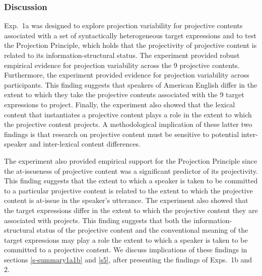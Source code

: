\documentclass[11pt,fleqn]{article}
\newcommand{\6}{\mbox{$[\hspace*{-.6mm}[$}}
\newcommand{\9}{\mbox{$]\hspace*{-.6mm}]$}}
\newcommand{\jd}[1]{\textbf{\color{Green}[jd: #1]}}
\begin{document}
%
%
%
%
%
%


\subsubsection{Discussion}\label{s-discussion1a}

Exp.~1a was designed to explore projection variability for projective contents associated with a set of syntactically heterogeneous target expressions and to test the Projection Principle, which holds that the projectivity of projective content is related to its information-structural status. The experiment provided robust empirical evidence for projection variability across the 9 projective contents. Furthermore, the experiment provided evidence for projection variability across participants. This finding suggests that speakers of American English differ in the extent to which they take the projective contents associated with the 9 target expressions to project. Finally, the experiment also showed that the lexical content that instantiates a projective content plays a role in the extent to which the projective content projects. A methodological implication of these latter two findings is that research on projective content must be sensitive to potential inter-speaker and inter-lexical content differences.

The experiment also provided empirical support for the Projection Principle since the at-issueness of projective content was a significant predictor of its projectivity. This finding suggests that the extent to which a speaker is taken to be committed to a particular projective content is related to the extent to which the projective content is at-issue in the speaker's utterance. The experiment also showed that the target expressions differ in the extent to which the projective content they are associated with projects. This finding suggests that both the information-structural status of the projective content and the conventional meaning of the target expressions may play a role the extent to which a speaker is taken to be committed to a projective content. We discuss implications of these findings in sections \ref{s-summary1a1b} and \ref{s5}, after presenting the findings of Exps.~1b and 2.
\end{document}
